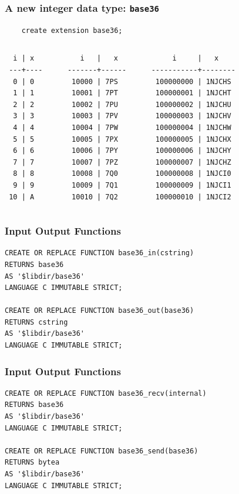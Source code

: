 \documentclass{beamer}
\begin{document}
\begin{frame}[fragile]
  \frametitle{A new integer data type: \texttt{base36}}

  \begin{verbatim}
    create extension base36;
  \end{verbatim}  
  \vfill

\begin{columns}
\begin{verbatim}
  i | x    
 ---+----
  0 | 0
  1 | 1
  2 | 2
  3 | 3
  4 | 4
  5 | 5
  6 | 6
  7 | 7
  8 | 8
  9 | 9
 10 | A
\end{verbatim}  
\begin{verbatim}     
    i   |   x    
 -------+------
  10000 | 7PS
  10001 | 7PT
  10002 | 7PU
  10003 | 7PV
  10004 | 7PW
  10005 | 7PX
  10006 | 7PY
  10007 | 7PZ
  10008 | 7Q0
  10009 | 7Q1
  10010 | 7Q2
\end{verbatim}  
\begin{verbatim}     
      i     |   x    
 -----------+--------
  100000000 | 1NJCHS
  100000001 | 1NJCHT
  100000002 | 1NJCHU
  100000003 | 1NJCHV
  100000004 | 1NJCHW
  100000005 | 1NJCHX
  100000006 | 1NJCHY
  100000007 | 1NJCHZ
  100000008 | 1NJCI0
  100000009 | 1NJCI1
  100000010 | 1NJCI2
\end{verbatim}  
\end{columns}
\end{frame}

\begin{frame}[fragile]
  \frametitle{Input Output Functions}

\begin{verbatim}
CREATE OR REPLACE FUNCTION base36_in(cstring)
RETURNS base36
AS '$libdir/base36'
LANGUAGE C IMMUTABLE STRICT;

CREATE OR REPLACE FUNCTION base36_out(base36)
RETURNS cstring
AS '$libdir/base36'
LANGUAGE C IMMUTABLE STRICT;
\end{verbatim}
\end{frame}

\begin{frame}[fragile]
  \frametitle{Input Output Functions}

\begin{verbatim}
CREATE OR REPLACE FUNCTION base36_recv(internal)
RETURNS base36
AS '$libdir/base36'
LANGUAGE C IMMUTABLE STRICT;

CREATE OR REPLACE FUNCTION base36_send(base36)
RETURNS bytea
AS '$libdir/base36'
LANGUAGE C IMMUTABLE STRICT;
\end{verbatim}
\end{frame}
\end{document}
